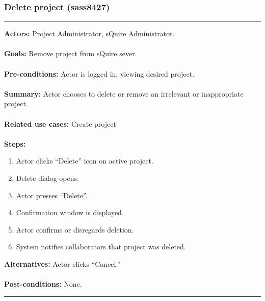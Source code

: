 \documentclass[11pt]{report}
\begin{document}
\subsubsection{Delete project (sass8427)}
\vspace{2pt}
\hrule
\vspace{8pt}
 \textbf{Actors:} Project Administrator, sQuire Administrator. \\ \\
\textbf{Goals:} Remove project from sQuire sever. \\ \\
 \textbf{Pre-conditions:} Actor is logged in, viewing desired project.  \\ \\
\textbf{Summary:} Actor chooses to delete or remove an irrelevant or inappropriate project.  \\ \\
\textbf{Related use cases:} Create project\\ \\
\textbf{Steps:} \begin{enumerate}
  \item Actor clicks ``Delete'' icon on active project.
  \item Delete dialog opens.
  \item Actor presses ``Delete''. 
  \item Confirmation window is displayed.
  \item Actor confirms or disregards deletion.
  \item System notifies collaborators that project was deleted.
 \end{enumerate}
 \textbf{Alternatives:} Actor clicks ``Cancel.'' \\ \\
 \textbf{Post-conditions:} None. \\
\vspace{8pt}
\hrule
\newpage
\end{document}
